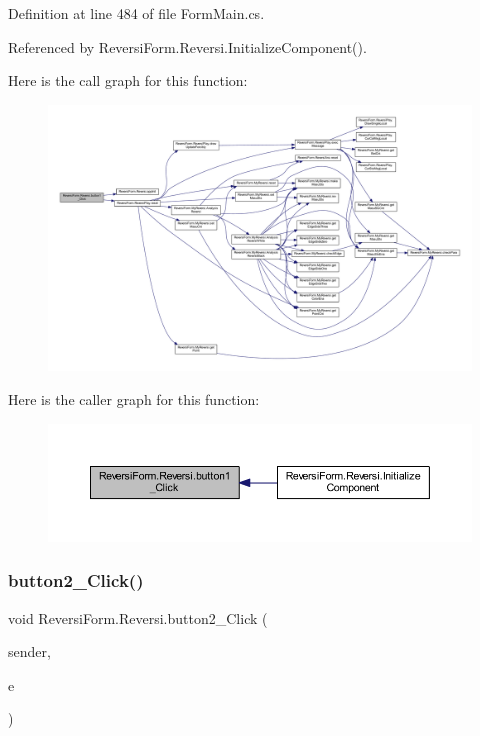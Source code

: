 Definition at line 484 of file Form\+Main.\+cs.



Referenced by Reversi\+Form.\+Reversi.\+Initialize\+Component().

Here is the call graph for this function\+:
\nopagebreak
\begin{figure}[H]
\begin{center}
\leavevmode
\includegraphics[width=350pt]{class_reversi_form_1_1_reversi_a832e3ee4b606141b3feefb47742b3849_cgraph}
\end{center}
\end{figure}
Here is the caller graph for this function\+:
\nopagebreak
\begin{figure}[H]
\begin{center}
\leavevmode
\includegraphics[width=350pt]{class_reversi_form_1_1_reversi_a832e3ee4b606141b3feefb47742b3849_icgraph}
\end{center}
\end{figure}
\mbox{\label{class_reversi_form_1_1_reversi_aa908556d4f216f8b407c1458e392dfc5}} 
\subsubsection{\texorpdfstring{button2\+\_\+\+Click()}{button2\_Click()}}
{\footnotesize\ttfamily void Reversi\+Form.\+Reversi.\+button2\+\_\+\+Click (\begin{DoxyParamCaption}\item[{object}]{sender,  }\item[{Event\+Args}]{e }\end{DoxyParamCaption})\hspace{0.3cm}{\ttfamily [private]}}



